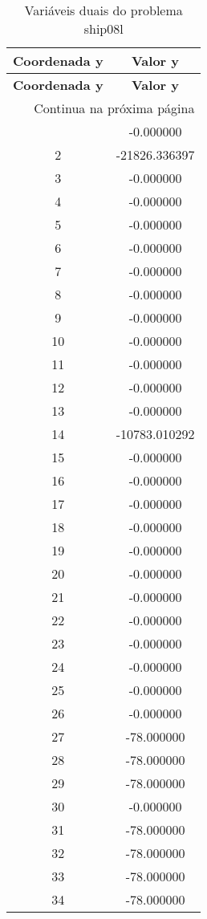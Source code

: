 \documentclass[12pt]{article}
\begin{document}
\begin{longtable}{@{}cc@{}}
\caption{Variáveis duais do problema ship08l} \\
\toprule
\textbf{Coordenada y} & \textbf{Valor y} \\
\midrule
\endfirsthead

\toprule
\textbf{Coordenada y} & \textbf{Valor y} \\
\midrule
\endhead

\midrule \multicolumn{2}{r}{{Continua na próxima página}} \\ \midrule
\endfoot

\bottomrule
\endlastfoot
1 & -0.000000 \\
2 & -21826.336397 \\
3 & -0.000000 \\
4 & -0.000000 \\
5 & -0.000000 \\
6 & -0.000000 \\
7 & -0.000000 \\
8 & -0.000000 \\
9 & -0.000000 \\
10 & -0.000000 \\
11 & -0.000000 \\
12 & -0.000000 \\
13 & -0.000000 \\
14 & -10783.010292 \\
15 & -0.000000 \\
16 & -0.000000 \\
17 & -0.000000 \\
18 & -0.000000 \\
19 & -0.000000 \\
20 & -0.000000 \\
21 & -0.000000 \\
22 & -0.000000 \\
23 & -0.000000 \\
24 & -0.000000 \\
25 & -0.000000 \\
26 & -0.000000 \\
27 & -78.000000 \\
28 & -78.000000 \\
29 & -78.000000 \\
30 & -0.000000 \\
31 & -78.000000 \\
32 & -78.000000 \\
33 & -78.000000 \\
34 & -78.000000 \\

\end{longtable}
\end{document}
